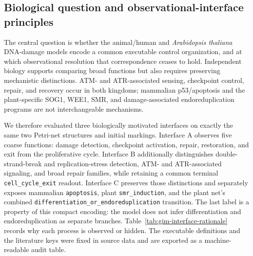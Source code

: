 \documentclass{ws-jbcb}
\numberwithin{equation}{section}
\newcommand{\tas}{\textit{Arabidopsis thaliana}}
\begin{document}
\subsection{Biological question and observational-interface principles}
\label{sec:gim-question}

The central question is whether the animal/human and \tas{} DNA-damage models
encode a common executable control organization, and at which observational
resolution that correspondence ceases to hold. Independent biology supports
comparing broad functions but also requires preserving mechanistic distinctions.
ATM- and ATR-associated sensing, checkpoint control, repair, and recovery occur
in both kingdoms; mammalian p53/apoptosis and the plant-specific SOG1, WEE1, SMR,
and damage-associated endoreduplication programs are not interchangeable
mechanisms.\cite{JacksonBartek2009,BlackfordJackson2017,Yoshiyama2013,
DeSchutter2007,Yi2014,Adachi2011,Ogita2018,ManovaGruszka2015}

We therefore evaluated three biologically motivated interfaces on exactly the
same two Petri-net structures and initial markings. Interface A observes five
coarse functions: damage detection, checkpoint activation, repair, restoration,
and exit from the proliferative cycle. Interface B additionally distinguishes
double-strand-break and replication-stress detection, ATM- and ATR-associated
signaling, and broad repair families, while retaining a common terminal
\texttt{cell\_cycle\_exit} readout. Interface C preserves those distinctions and
separately exposes mammalian \texttt{apoptosis}, plant
\texttt{smr\_induction}, and the plant net's combined
\texttt{differentiation\_or\_endoreduplication} transition. The last label is a
property of this compact encoding: the model does not infer differentiation and
endoreduplication as separate branches. Table~\ref{tab:gim-interface-rationale}
records why each process is observed or hidden. The executable definitions and
the literature keys were fixed in source data and are exported as a
machine-readable audit table.
\end{document}
